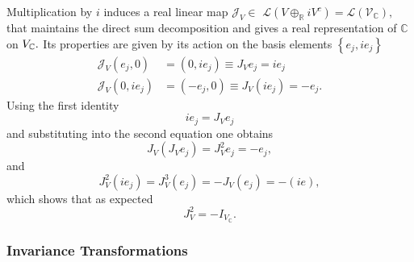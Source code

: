 \documentclass[aps,preprint]{revtex4}
\begin{document}
Multiplication by $i$ induces a real linear map $\mathcal{J}_{V}\in$ $%
\mathcal{L}\left( V\oplus_{\mathbb{R}}iV^{c}\right) =\mathcal{L}\left( 
\mathcal{V}_{\mathbb{C}}\right) ,$ that maintains the direct sum
decomposition and gives a real representation of $\mathbb{C}$ on $V_{\mathbb{%
C}}.$ Its properties are given by its action on the basis elements $\left\{
e_{j},ie_{j}\right\} $ 
\begin{align}
\mathcal{J}_{V}\left( e_{j},0\right) & =\left( 0,ie_{j}\right) \equiv
J_{V}e_{j}=ie_{j} \\
\mathcal{J}_{V}\left( 0,ie_{j}\right) & =\left( -e_{j},0\right) \equiv
J_{V}\left( ie_{j}\right) =-e_{j}.
\end{align}
Using the first identity 
\begin{equation}
ie_{j}=J_{V}e_{j}
\end{equation}
and substituting into the second equation one obtains 
\begin{equation}
J_{V}\left( J_{V}e_{j}\right) =J_{V}^{2}e_{j}=-e_{j},
\end{equation}
and 
\begin{equation}
J_{V}^{2}\left( ie_{j}\right) =J_{V}^{3}\left( e_{j}\right) =-J_{V}\left(
e_{j}\right) =-\left( ie\right) ,
\end{equation}
which shows that as expected 
\begin{equation}
J_{V}^{2}=-I_{V_{\mathbb{C}}}.
\end{equation}

\subsubsection{Invariance Transformations}
\end{document}
